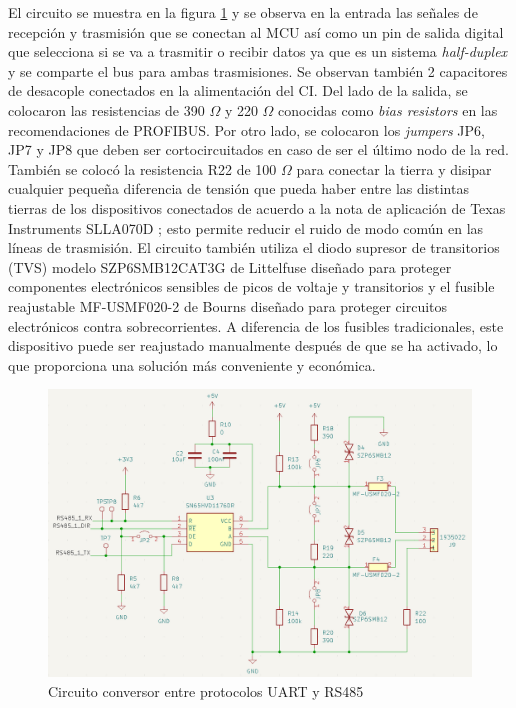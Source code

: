 El circuito se muestra en la figura \ref{fig:rs485_sch} y se observa en la entrada las señales de recepción y trasmisión que se conectan al MCU así como un pin de salida digital que selecciona si se va a trasmitir o recibir datos ya que es un sistema \textit{half-duplex} y se comparte el bus para ambas trasmisiones. Se observan también 2 capacitores de desacople conectados en la alimentación del CI. Del lado de la salida, se colocaron las resistencias de 390 $\Omega$ y 220 $\Omega$ conocidas como \textit{bias resistors} en las recomendaciones de PROFIBUS. Por otro lado, se colocaron los \textit{jumpers} JP6, JP7 y JP8 que deben ser cortocircuitados en caso de ser el último nodo de la red. También se colocó la resistencia R22 de 100 $\Omega$ para conectar la tierra y disipar cualquier pequeña diferencia de tensión que pueda haber entre las distintas tierras de los dispositivos conectados de acuerdo a la nota de aplicación de Texas Instruments SLLA070D \cite{rs485}; esto permite reducir el ruido de modo común en las líneas de trasmisión. El circuito también utiliza el diodo supresor de transitorios (TVS) modelo SZP6SMB12CAT3G de Littelfuse \cite{SZP6SMB12CAT3G} diseñado para proteger componentes electrónicos sensibles de picos de voltaje y transitorios y el fusible reajustable MF-USMF020-2 de Bourns \cite{MF-USMF020-2} diseñado para proteger circuitos electrónicos contra sobrecorrientes. A diferencia de los fusibles tradicionales, este dispositivo puede ser reajustado manualmente después de que se ha activado, lo que proporciona una solución más conveniente y económica.




\begin{figure}[H]
    \centering
    \includegraphics[width =\linewidth]{img/rs485_sch.png}
    \caption{Circuito conversor entre protocolos UART y RS485}
    \label{fig:rs485_sch}
\end{figure}    